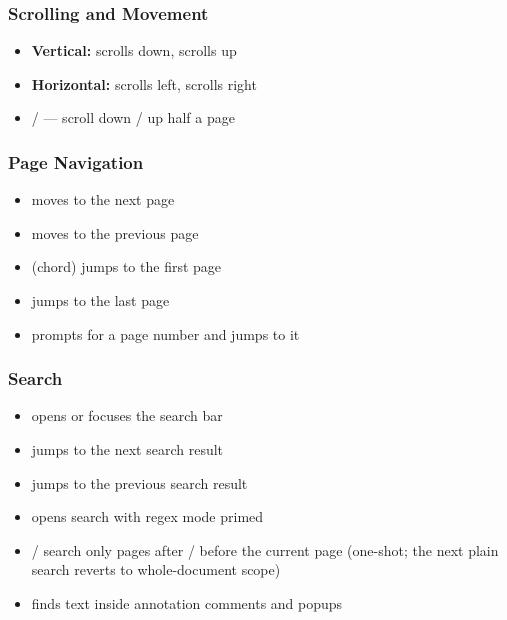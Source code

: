 \documentclass[a4paper,12pt]{article}
\begin{document}
\subsubsection{Scrolling and Movement}

\begin{itemize}[leftmargin=*]
    \item \textbf{Vertical:}  scrolls down,\;  scrolls up
    \item \textbf{Horizontal:}  scrolls left,\;  scrolls right
    \item {} /  — scroll down / up half a page
\end{itemize}

\subsubsection{Page Navigation}

\begin{itemize}[leftmargin=*]
    \item {} moves to the next page
    \item {} moves to the previous page
    \item {} (chord) jumps to the first page
    \item {} jumps to the last page
    \item {} prompts for a page number and jumps to it
\end{itemize}

\subsubsection{Search}
\begin{itemize}[leftmargin=*]
    \item \keys{/} opens or focuses the search bar
    \item {} jumps to the next search result
    \item {} jumps to the previous search result
    \item {} opens search with regex mode primed
    \item {} /  search only pages after / before the current page (one-shot; the next plain search reverts to whole-document scope)
    \item {} finds text inside annotation comments and popups
\end{itemize}
\end{document}
